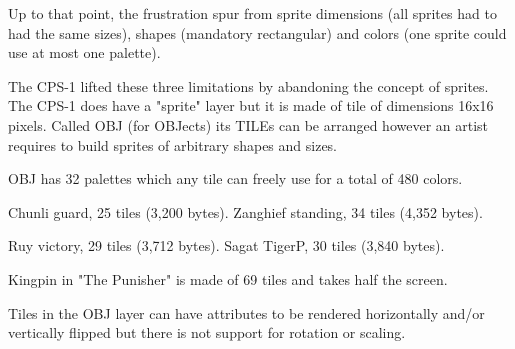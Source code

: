 Up to that point, the frustration spur from sprite dimensions (all sprites had to had the same sizes), shapes (mandatory rectangular) and colors (one sprite could use at most one palette). 

The CPS-1 lifted these three limitations by abandoning the concept of sprites. The CPS-1 does have a "sprite" layer but it is made of tile of dimensions 16x16 pixels. Called OBJ (for OBJects) its TILEs can be arranged however an artist requires to build sprites of arbitrary shapes and sizes. 

OBJ has 32 palettes which any tile can freely use for a total of 480 colors.




\begin{minipage}[t]{0.453\linewidth}
\end{minipage}%
\hfill%
\begin{minipage}[t]{0.53\linewidth}
\end{minipage}



Chunli guard, 25 tiles (3,200 bytes). Zanghief standing, 34 tiles (4,352 bytes). 

\begin{minipage}[t]{0.3\linewidth}
\end{minipage}%
\hfill%
\begin{minipage}[t]{0.53\linewidth}
\end{minipage}

Ruy victory, 29 tiles (3,712 bytes). Sagat TigerP, 30 tiles (3,840 bytes). 




Kingpin in "The Punisher" is made of 69 tiles and takes half the screen.


Tiles in the OBJ layer can have attributes to be rendered horizontally and/or vertically flipped but there is not support for rotation or scaling.

\begin{minipage}[t]{0.535\linewidth}
\end{minipage}%
\hfill%
\begin{minipage}[t]{0.445\linewidth}
\end{minipage}

